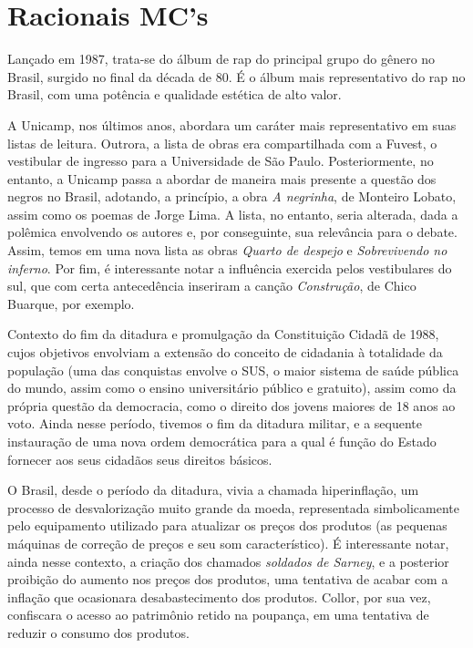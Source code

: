 
\chapter{Racionais MC's}

Lançado em 1987, trata-se do álbum de rap do principal grupo do gênero no Brasil, surgido no final da década de 80. É o álbum mais representativo do rap no Brasil, com uma potência e qualidade estética de alto valor.

A Unicamp, nos últimos anos, abordara um caráter mais representativo em suas listas de leitura. Outrora, a lista de obras era compartilhada com a Fuvest, o vestibular de ingresso para a Universidade de São Paulo. Posteriormente, no entanto, a Unicamp passa a abordar de maneira mais presente a questão dos negros no Brasil, adotando, a princípio, a obra \textit{A negrinha}, de Monteiro Lobato, assim como os poemas de Jorge Lima. A lista, no entanto, seria alterada, dada a polêmica envolvendo os autores e, por conseguinte, sua relevância para o debate. Assim, temos em uma nova lista as obras \textit{Quarto de despejo} e \textit{Sobrevivendo no inferno}. Por fim, é interessante notar a influência exercida pelos vestibulares do sul, que com certa antecedência inseriram a canção \textit{Construção}, de Chico Buarque, por exemplo.

Contexto do fim da ditadura e promulgação da Constituição Cidadã de 1988, cujos objetivos envolviam a extensão do conceito de cidadania à totalidade da população (uma das conquistas envolve o SUS, o maior sistema de saúde pública do mundo, assim como o ensino universitário público e gratuito), assim como da própria questão da democracia, como o direito dos jovens maiores de 18 anos ao voto. Ainda nesse período, tivemos o fim da ditadura militar, e a sequente instauração de uma nova ordem democrática para a qual é função do Estado fornecer aos seus cidadãos seus direitos básicos.

O Brasil, desde o período da ditadura, vivia a chamada hiperinflação, um processo de desvalorização muito grande da moeda, representada simbolicamente pelo equipamento utilizado para atualizar os preços dos produtos (as pequenas máquinas de correção de preços e seu som característico). É interessante notar, ainda nesse contexto, a criação dos chamados \textit{soldados de Sarney}, e a posterior proibição do aumento nos preços dos produtos, uma tentativa de acabar com a inflação que ocasionara desabastecimento dos produtos. Collor, por sua vez, confiscara o acesso ao patrimônio retido na poupança, em uma tentativa de reduzir o consumo dos produtos.

